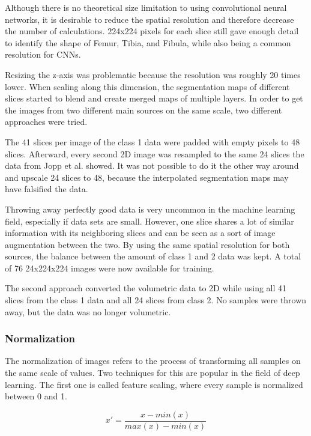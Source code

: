 Although there is no theoretical size limitation to using convolutional neural networks, it is desirable to reduce the spatial resolution and therefore decrease the number of calculations. 224x224 pixels for each slice still gave enough detail to identify the shape of Femur, Tibia, and Fibula, while also being a common resolution for CNNs.

Resizing the z-axis was problematic because the resolution was roughly 20 times lower. When scaling along this dimension, the segmentation maps of different slices started to blend and create merged maps of multiple layers. In order to get the images from two different main sources on the same scale, two different approaches were tried.

The 41 slices per image of the class 1 data were padded with empty pixels to 48 slices. Afterward, every second 2D image was resampled to the same 24 slices the data from Jopp et al. showed. It was not possible to do it the other way around and upscale 24 slices to 48, because the interpolated segmentation maps may have falsified the data.

Throwing away perfectly good data is very uncommon in the machine learning field, especially if data sets are small. However, one slice shares a lot of similar information with its neighboring slices and can be seen as a sort of image augmentation between the two. By using the same spatial resolution for both sources, the balance between the amount of class 1 and 2 data was kept. A total of 76 24x224x224 images were now available for training.

The second approach converted the volumetric data to 2D while using all 41 slices from the class 1 data and all 24 slices from class 2. No samples were thrown away, but the data was no longer volumetric. 

\subsubsection{Normalization}

The normalization of images refers to the process of transforming all samples on the same scale of values. Two techniques for this are popular in the field of deep learning. The first one is called feature scaling, where every sample is normalized between 0 and 1.

\begin{figure}[H]
\[x' = \frac {x - min(x)}{max(x) - min(x)}\]
\end{figure}

